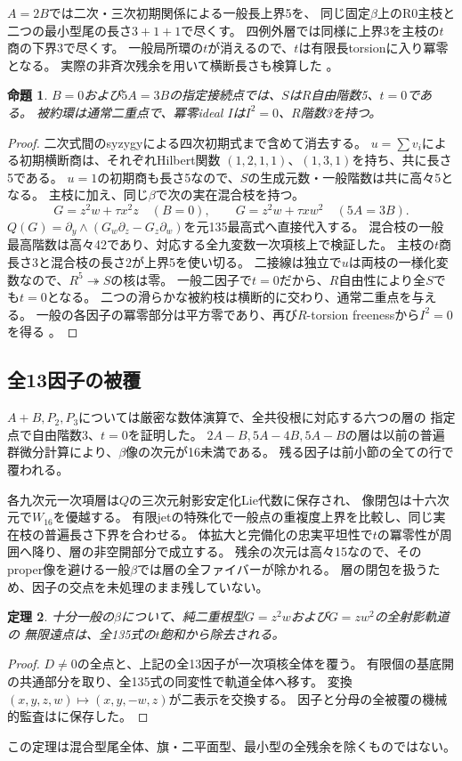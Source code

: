 \documentclass[11pt,a4paper]{ltjsarticle}
\newtheorem{theorem}{定理}[section]
\newtheorem{proposition}[theorem]{命題}
\theoremstyle{remark}
\begin{document}
$A=2B$では二次・三次初期関係による一般長上界5を、
同じ固定$\beta$上のR0主枝と二つの最小型尾の長さ$3+1+1$で尽くす。
四例外層では同様に上界3を主枝の$t$商の下界3で尽くす。
一般局所環の$t$が消えるので、$t$は有限長torsionに入り冪零となる。
実際の非斉次残余を用いて横断長さも検算した
\cite{double-endpoint-v38,double-torsion-v38}。

\begin{proposition}
$B=0$および$5A=3B$の指定接続点では、$S$は$R$自由階数5、$t=0$である。
被約環は通常二重点で、冪零ideal $I$は$I^2=0$、$R$階数3を持つ。
\end{proposition}
\begin{proof}
二次式間のsyzygyによる四次初期式まで含めて消去する。
$u=\sum v_i$による初期横断商は、それぞれHilbert関数
$(1,2,1,1)$、$(1,3,1)$を持ち、共に長さ5である。
$u=1$の初期商も長さ5なので、$S$の生成元数・一般階数は共に高々5となる。
主枝に加え、同じ$\beta$で次の実在混合枝を持つ。
\[
 G=z^2w+\tau x^2z\quad(B=0),\qquad
 G=z^2w+\tau xw^2\quad(5A=3B).
\]
$Q(G)=\partial_y\wedge(G_w\partial_z-G_z\partial_w)$を元135最高式へ直接代入する。
混合枝の一般最高階数は高々42であり、対応する全九変数一次項核上で検証した。
主枝の$t$商長さ3と混合枝の長さ2が上界5を使い切る。
二接線は独立で$u$は両枝の一様化変数なので、$R^5\twoheadrightarrow S$の核は零。
一般二因子で$t=0$だから、$R$自由性により全$S$でも$t=0$となる。
二つの滑らかな被約枝は横断的に交わり、通常二重点を与える。
一般の各因子の冪零部分は平方零であり、再び$R$-torsion freenessから$I^2=0$を得る
\cite{double-mixed-v38}。
\end{proof}

\subsection{全13因子の被覆}
$A+B,P_2,P_3$については厳密な数体演算で、全共役根に対応する六つの層の
指定点で自由階数3、$t=0$を証明した\cite{double-artifacts-v38}。
$2A-B,5A-4B,5A-B$の層は以前の普遍群微分計算により、$\beta$像の次元が16未満である。
残る因子は前小節の全ての行で覆われる。

各九次元一次項層は$Q$の三次元射影安定化Lie代数に保存され、
像閉包は十六次元で$W_{16}$を優越する。
有限jetの特殊化で一般点の重複度上界を比較し、同じ実在枝の普遍長さ下界を合わせる。
体拡大と完備化の忠実平坦性で$t$の冪零性が周囲へ降り、層の非空開部分で成立する。
残余の次元は高々15なので、そのproper像を避ける一般$\beta$では層の全ファイバーが除かれる。
層の閉包を扱うため、因子の交点を未処理のまま残していない。
\begin{theorem}
十分一般の$\beta$について、純二重根型$G=z^2w$および$G=zw^2$の全射影軌道の
無限遠点は、全135式の$t$飽和から除去される。
\end{theorem}
\begin{proof}
$D\ne0$の全点と、上記の全13因子が一次項核全体を覆う。
有限個の基底開の共通部分を取り、全135式の同変性で軌道全体へ移す。
変換$(x,y,z,w)\mapsto(x,y,-w,z)$が二表示を交換する。
因子と分母の全被覆の機械的監査は\cite{double-exhaust-v38}に保存した。
\end{proof}
この定理は混合型尾全体、旗・二平面型、最小型の全残余を除くものではない。
\end{document}
